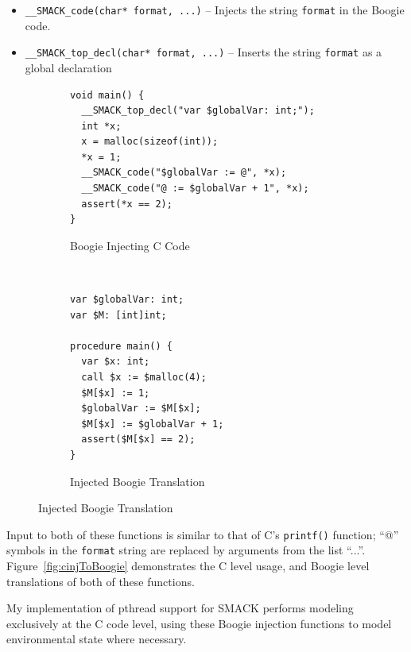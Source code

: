 \begin{itemize}
\item \lstinline|__SMACK_code(char* format, ...)| -- Injects the
  string \lstinline|format| in the Boogie code.
\item \lstinline|__SMACK_top_decl(char* format, ...)| -- Inserts the
  string \lstinline|format| as a global declaration 
\end{itemize}

\begin{figure}[h]
\centering
\caption{Injecting Boogie Code from C}\label{fig:cinjToBoogie}
\begin{subfigure}[b]{1\textwidth}
\centering
\caption{Boogie Injecting C Code}\label{fig:cinjToBoogie_a}
\begin{lstlisting}
void main() {
  __SMACK_top_decl("var $globalVar: int;");
  int *x;
  x = malloc(sizeof(int));
  *x = 1;
  __SMACK_code("$globalVar := @", *x);
  __SMACK_code("@ := $globalVar + 1", *x);
  assert(*x == 2);
}
\end{lstlisting}
\end{subfigure}
~
\begin{subfigure}[b]{1\textwidth}
\centering
\caption{Injected Boogie Translation}\label{fig:cinjToBoogie_b}
\begin{lstlisting}[language=boogie]
var $globalVar: int;
var $M: [int]int;

procedure main() {
  var $x: int;
  call $x := $malloc(4);
  $M[$x] := 1;
  $globalVar := $M[$x];
  $M[$x] := $globalVar + 1;
  assert($M[$x] == 2);
}
\end{lstlisting}
\end{subfigure}
\end{figure}

Input to both of these functions is similar to that of C's
\lstinline|printf()| function; ``@'' symbols in the
\lstinline|format| string are replaced by arguments from the list
``...''.  Figure~\ref{fig:cinjToBoogie} demonstrates the C level usage,
and Boogie level translations of both of these functions.

My implementation of pthread support for SMACK performs modeling
exclusively at the C code level, using these Boogie injection
functions to model environmental state where necessary.




